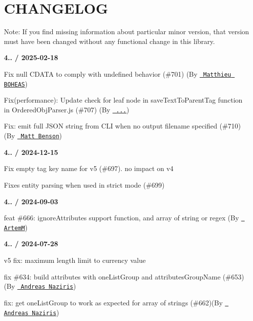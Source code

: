 \chapter{CHANGELOG}
\hypertarget{md_node__modules_2fast-xml-parser_2_c_h_a_n_g_e_l_o_g}{}\label{md_node__modules_2fast-xml-parser_2_c_h_a_n_g_e_l_o_g}

\footnotesize Note\+: If you find missing information about particular minor version, that version must have been changed without any functional change in this library.
\normalsize 

{\bfseries{4.. / 2025-\/02-\/18}}
\begin{DoxyItemize}
\item Fix null CDATA to comply with undefined behavior (\#701) (By \href{https://github.com/Kelgors}{\texttt{ Matthieu BOHEAS}})
\item Fix(performance)\+: Update check for leaf node in save\+Text\+To\+Parent\+Tag function in Ordered\+Obj\+Parser.\+js (\#707) (By \href{https://github.com/tomingtoming}{\texttt{ ...}})
\item Fix\+: emit full JSON string from CLI when no output filename specified (\#710) (By \href{https://github.com/mbenson}{\texttt{ Matt Benson}})
\end{DoxyItemize}

{\bfseries{4.. / 2024-\/12-\/15}}
\begin{DoxyItemize}
\item Fix empty tag key name for v5 (\#697). no impact on v4
\item Fixes entity parsing when used in strict mode (\#699)
\end{DoxyItemize}

{\bfseries{4.. / 2024-\/09-\/03}}
\begin{DoxyItemize}
\item feat \#666\+: ignore\+Attributes support function, and array of string or regex (By \href{https://github.com/mav-rik}{\texttt{ ArtemM}})
\end{DoxyItemize}

{\bfseries{4.. / 2024-\/07-\/28}}
\begin{DoxyItemize}
\item v5 fix\+: maximum length limit to currency value
\item fix \#634\+: build attributes with one\+List\+Group and attributes\+Group\+Name (\#653)(By \href{https://github.com/a-rasin}{\texttt{ Andreas Naziris}})
\item fix\+: get one\+List\+Group to work as expected for array of strings (\#662)(By \href{https://github.com/a-rasin}{\texttt{ Andreas Naziris}})
\end{DoxyItemize}

